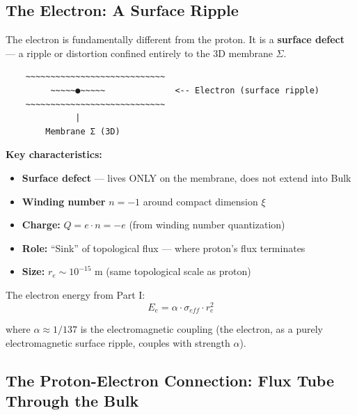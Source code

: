 \subsection{The Electron: A Surface Ripple}
\label{subsec:electron_structure}

The electron is fundamentally different from the proton. It is a \textbf{surface defect} --- a ripple or distortion confined entirely to the 3D membrane $\Sigma$.

\begin{tcolorbox}[colback=green!5,colframe=green!70!black,title=\textbf{Electron Structure}]
\begin{verbatim}
    ~~~~~~~~~~~~~~~~~~~~~~~~~~~~
         ~~~~~●~~~~~              <-- Electron (surface ripple)
    ~~~~~~~~~~~~~~~~~~~~~~~~~~~~
              |
        Membrane Σ (3D)
\end{verbatim}
\end{tcolorbox}

\textbf{Key characteristics:}
\begin{itemize}
    \item \textbf{Surface defect} --- lives ONLY on the membrane, does not extend into Bulk
    \item \textbf{Winding number} $n = -1$ around compact dimension $\xi$
    \item \textbf{Charge:} $Q = e \cdot n = -e$ (from winding number quantization)
    \item \textbf{Role:} ``Sink'' of topological flux --- where proton's flux terminates
    \item \textbf{Size:} $r_e \sim 10^{-15}$ m (same topological scale as proton)
\end{itemize}

The electron energy from Part I:
\begin{equation}
E_e = \alpha \cdot \sigma_{eff} \cdot r_e^2
\label{eq:electron_energy}
\end{equation}

where $\alpha \approx 1/137$ is the electromagnetic coupling (the electron, as a purely electromagnetic surface ripple, couples with strength $\alpha$).

\subsection{The Proton-Electron Connection: Flux Tube Through the Bulk}
\label{subsec:flux_tube}

